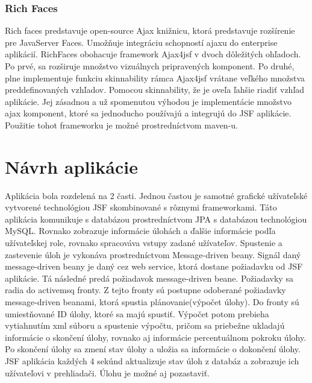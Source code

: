 \subsubsection{Rich Faces}
Rich faces predstavuje open-source Ajax knižnicu, ktorá predstavuje rozšírenie pre JavaServer Faces. Umožňuje integráciu schopností ajaxu do enterprise aplikácií. RichFaces obohacuje framework Ajax4jsf v dvoch dôležitých ohľadoch. Po prvé, sa rozširuje množstvo vizuálnych pripravených komponent. Po druhé,  plne implementuje funkciu skinnability rámca Ajax4jsf vrátane veľkého množstva preddefinovaných vzhľadov. Pomocou skinnability, že je oveľa ľahšie riadiť vzhľad aplikácie. Jej zásadnou a už spomenutou výhodou je implementácie množstvo ajax komponent, ktoré sa jednoducho používajú a integrujú do JSF aplikácie. Použitie tohot frameworku je možné prostredníctvom maven-u.





\section{Návrh aplikácie}
Aplikácia bola rozdelená na 2 časti. Jednou častou je samotné grafické užívateľské vytvorené technológiou JSF skombinované s rôznymi frameworkami. Táto aplikácia komunikuje s databázou prostredníctvom JPA s databázou technológiou MySQL. Rovnako zobrazuje informácie úlohách a ďalšie informácie podľa užívateľskej role, rovnako spracováva vstupy zadané užívateľov. Spustenie a zastevenie úloh je vykonáva prostredníctvom Message-driven beany. Signál daný message-driven beany je daný cez web service, ktorá dostane požiadavku od JSF aplikácie. Tá následné predá požiadavok message-driven beane. Požiadavky sa radia do activemsq fronty. Z tejto fronty sú postupne odoberané požiadavky message-driven beanami, ktorá spustia plánovanie(výpočet úlohy). Do fronty sú umiestňované ID úlohy, ktoré sa majú spustiť. Výpočet potom prebieha vytiahnutím xml súboru a spustenie výpočtu, pričom sa priebežne ukladajú informácie o skončení úlohy, rovnako aj informácie percentuálnom pokroku úlohy. Po skončení úlohy sa zmení stav úlohy a uložia sa informácie o dokončení úlohy. JSF aplikácia každých 4 sekúnd aktualizuje stav úloh z databáz a zobrazuje ich užívateľovi v prehliadači. Úlohu je možné aj pozastaviť. 





